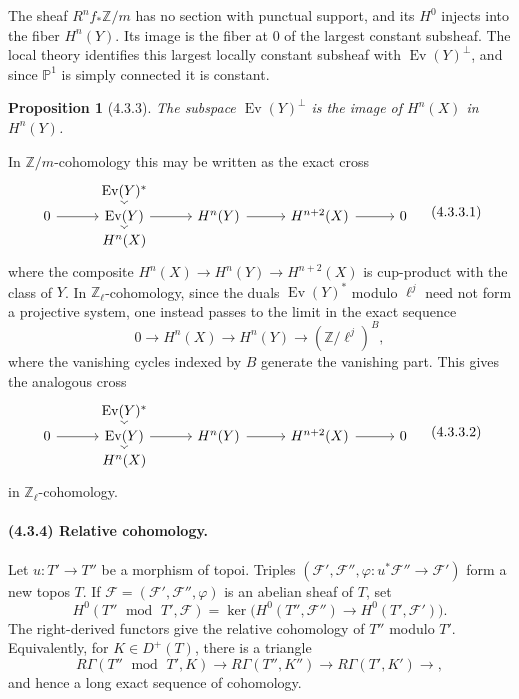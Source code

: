 \documentclass[11pt]{article}
\newtheorem{proposition}{Proposition}
\theoremstyle{remark}
\begin{document}
The sheaf $R^n f_*\mathbb Z/m$ has no section with punctual support, and its $H^0$ injects into the fiber $H^n(Y)$. Its image is the fiber at $0$ of the largest constant subsheaf. The local theory identifies this largest locally constant subsheaf with $\operatorname{Ev}(Y)^\perp$, and since $\mathbb P^1$ is simply connected it is constant.

\begin{proposition}[4.3.3]
The subspace $\operatorname{Ev}(Y)^\perp$ is the image of $H^n(X)$ in $H^n(Y)$.
\end{proposition}

In $\mathbb Z/m$-cohomology this may be written as the exact cross
\[
\begin{tikzcd}[column sep=2.8em,row sep=1.6em]
& \operatorname{Ev}(Y)^* \arrow[d]
\cr
0 \arrow[r] & \operatorname{Ev}(Y) \arrow[r] & H^n(Y) \arrow[r] & H^{n+2}(X) \arrow[r] & 0
\cr
& H^n(X) \arrow[u]
\end{tikzcd}
\tag{4.3.3.1}
\]
where the composite $H^n(X)\to H^n(Y)\to H^{n+2}(X)$ is cup-product with the class of $Y$. In $\mathbb Z_\ell$-cohomology, since the duals $\operatorname{Ev}(Y)^*$ modulo $\ell^j$ need not form a projective system, one instead passes to the limit in the exact sequence
\[
0\to H^n(X)\to H^n(Y)\to (\mathbb Z/\ell^j)^B,
\]
where the vanishing cycles indexed by $B$ generate the vanishing part. This gives the analogous cross
\[
\begin{tikzcd}[column sep=2.8em,row sep=1.6em]
& \operatorname{Ev}(Y)^* \arrow[d]
\cr
0 \arrow[r] & \operatorname{Ev}(Y) \arrow[r] & H^n(Y) \arrow[r] & H^{n+2}(X) \arrow[r] & 0
\cr
& H^n(X) \arrow[u]
\end{tikzcd}
\tag{4.3.3.2}
\]
in $\mathbb Z_\ell$-cohomology.

\paragraph{(4.3.4) Relative cohomology.}
Let $u:T'\to T''$ be a morphism of topoi. Triples $(\mathcal F',\mathcal F'',\varphi:u^*\mathcal F''\to\mathcal F')$ form a new topos $T$. If $\mathcal F=(\mathcal F',\mathcal F'',\varphi)$ is an abelian sheaf of $T$, set
\[
H^0(T''\operatorname{\ mod\ }T',\mathcal F)=
\ker\bigl(H^0(T'',\mathcal F'')\to H^0(T',\mathcal F')\bigr).
\]
The right-derived functors give the relative cohomology of $T''$ modulo $T'$. Equivalently, for $K\in D^+(T)$, there is a triangle
\[
R\Gamma(T''\operatorname{\ mod\ }T',K)\to R\Gamma(T'',K'')\to R\Gamma(T',K')\to,
\]
and hence a long exact sequence of cohomology.
\end{document}
